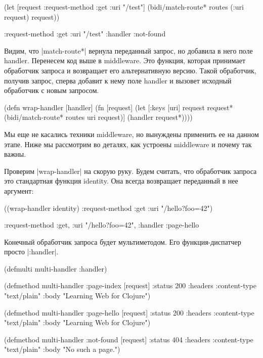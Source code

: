 \begin{code}
(let [request
      {:request-method :get
       :uri "/test"}]
  (bidi/match-route* routes (:uri request) request))

{:request-method :get
 :uri "/test"
 :handler :not-found}
\end{code}

Видим, что \spverb|match-route*| вернула переданный запрос, но добавила в него поле
handler. Перенесем код выше в middleware. Это функция, которая принимает
обработчик запроса и возвращает его альтернативную версию. Такой обработчик,
получив запрос, сперва добавит к нему поле handler и вызовет исходный обработчик
с новым запросом.

\begin{code}
(defn wrap-handler
  [handler]
  (fn [request]
    (let [{:keys [uri]} request
          request* (bidi/match-route*
                    routes uri request)]
      (handler request*))))
\end{code}

Мы еще не касались техники middleware, но вынуждены применить ее на данном
этапе.  Ниже мы рассмотрим во деталях, как устроены middleware и почему так
важны.

Проверим \spverb|wrap-handler| на скорую руку. Будем считать, что обработчик запроса
это стандартная функция identity. Она всегда возвращает переданный в нее
аргумент:

\begin{code}
((wrap-handler identity)
 {:request-method :get
  :uri "/hello?foo=42"})

{:request-method :get,
 :uri "/hello?foo=42",
 :handler :page-hello}
\end{code}

Конечный обработчик запроса будет мультиметодом. Его функция-диспатчер просто
\spverb|:handler|.

\begin{code}
(defmulti multi-handler
  :handler)

(defmethod multi-handler :page-index
  [request]
  {:status 200
   :headers {:content-type "text/plain"}
   :body "Learning Web for Clojure"})

(defmethod multi-handler :page-hello
  [request]
  {:status 200
   :headers {:content-type "text/plain"}
   :body "Learning Web for Clojure"})

(defmethod multi-handler :not-found
  [request]
  {:status 404
   :headers {:content-type "text/plain"}
   :body "No such a page."})
\end{code}

